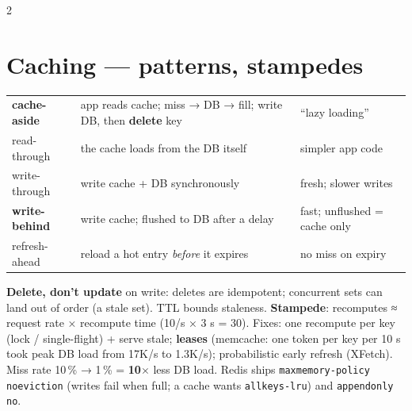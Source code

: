 \documentclass[8pt]{extarticle}
\newcommand\ct[1]{\texttt{#1}}
\begin{document}
\begin{multicols}{2}
\section{Caching — patterns, stampedes}
{\scriptsize\setlength{\tabcolsep}{3pt}
\begin{tabular}{@{}>{\raggedright\arraybackslash}p{15mm}>{\raggedright\arraybackslash}p{36mm}>{\raggedright\arraybackslash}p{23mm}@{}}
\toprule
\textbf{cache-aside} & app reads cache; miss → DB → fill; write DB, then \textbf{delete} key & ``lazy loading''\\
read-through & the cache loads from the DB itself & simpler app code\\
write-through & write cache + DB synchronously & fresh; slower writes\\
\textbf{write-behind} & write cache; flushed to DB after a delay & fast; unflushed = cache only\\
refresh-ahead & reload a hot entry \emph{before} it expires & no miss on expiry\\
\bottomrule
\end{tabular}}\par
\textbf{Delete, don't update} on write: deletes are idempotent; concurrent sets can land out of
order (a stale set). TTL bounds staleness. \textbf{Stampede}: recomputes ≈ request rate × recompute
time (10/s × 3 s = 30). Fixes: one recompute per key (lock / single-flight) + serve stale;
\textbf{leases} (memcache: one token per key per 10 s took peak DB load from 17K/s to 1.3K/s);
probabilistic early refresh (XFetch). Miss rate 10\,\% → 1\,\% = \textbf{10$\times$} less DB load.
Redis ships \ct{maxmemory-policy noeviction} (writes fail when full; a cache wants
\ct{allkeys-lru}) and \ct{appendonly no}.


\end{multicols}
\end{document}
